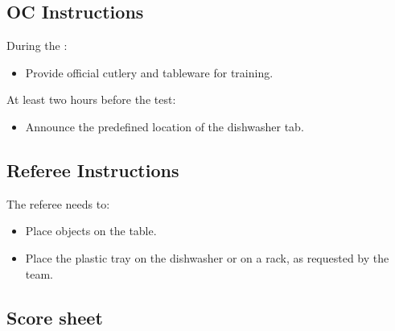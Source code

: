 \subsection*{OC Instructions}

During the \SetupDays:
\begin{itemize}
	\item Provide official cutlery and tableware for training.
\end{itemize}
At least two hours before the test:
\begin{itemize}
	\item Announce the predefined location of the dishwasher tab.
\end{itemize}


\subsection*{Referee Instructions}

The referee needs to:
\begin{itemize}
	\item Place objects on the table.
	\item Place the plastic tray on the dishwasher or on a rack, as requested by the team.
\end{itemize}

\subsection*{Score sheet}


